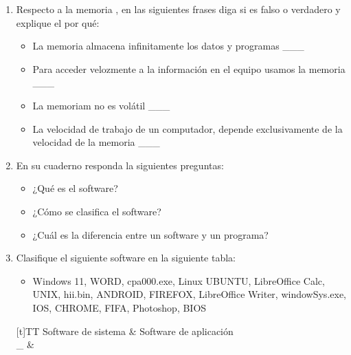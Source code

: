 \documentclass[letterpaper,10pt,spanish]{sphinxmanual}
\begin{document}
\begin{enumerate}
\item {} 
\sphinxAtStartPar
Respecto a la memoria , en las siguientes frases diga si es falso o verdadero y explique el por qué:
\begin{itemize}
\item {} 
\sphinxAtStartPar
La memoria  almacena infinitamente los datos y programas \_\_\_

\item {} 
\sphinxAtStartPar
Para acceder velozmente a la información en el equipo usamos la memoria  \_\_\_

\item {} 
\sphinxAtStartPar
La memoriam  no es volátil \_\_\_

\item {} 
\sphinxAtStartPar
La velocidad de trabajo de un computador, depende exclusivamente de la velocidad de la memoria  \_\_\_

\end{itemize}

\item {} 
\sphinxAtStartPar
En su cuaderno responda la siguientes preguntas:
\begin{itemize}
\item {} 
\sphinxAtStartPar
¿Qué es el software?

\item {} 
\sphinxAtStartPar
¿Cómo se clasifica el software?

\item {} 
\sphinxAtStartPar
¿Cuál es la diferencia entre un software y un programa?

\end{itemize}

\item {} 
\sphinxAtStartPar
Clasifique el siguiente software en la siguiente tabla:
\begin{itemize}
\item {} 
\sphinxAtStartPar
Windows 11, WORD, cpa000.exe, Linux UBUNTU, LibreOffice Calc, UNIX, hii.bin, ANDROID, FIREFOX, LibreOffice Writer, windowSys.exe, IOS, CHROME, FIFA, Photoshop, BIOS

\end{itemize}


\begin{savenotes}\sphinxattablestart
\sphinxthistablewithglobalstyle
\centering
\begin{tabulary}{\linewidth}[t]{TT}
\sphinxtoprule
\sphinxstyletheadfamily 
\sphinxAtStartPar
Software de sistema
&\sphinxstyletheadfamily 
\sphinxAtStartPar
Software de aplicación
\\
\sphinxmidrule
\sphinxtableatstartofbodyhook
\sphinxAtStartPar
\_
&
\sphinxAtStartPar


\end{tabulary}
\end{savenotes}
\end{enumerate}
\end{document}
